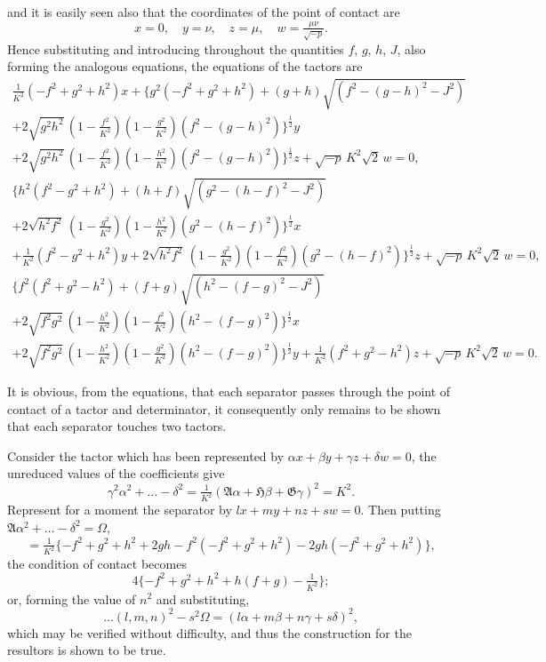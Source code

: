 \documentclass[11pt]{article}
\begin{document}
\newpage
\setcounter{page}{82}

and it is easily seen also that the coordinates of the point of contact are
\[
x = 0, \quad y = \nu, \quad z = \mu, \quad w = \tfrac{\mu\nu}{\sqrt{-p}}.
\]
Hence substituting and introducing throughout the quantities $f$, $g$, $h$, $J$, also forming the analogous equations, the equations of the tactors are
\begin{multline*}
\tfrac{1}{K^2}(-f^2+g^2+h^2)x + \{g^2(-f^2+g^2+h^2)+(g+h)\sqrt{(f^2-(g-h)^2-J^2)}\\
+ 2\sqrt{g^2h^2}\,(1-\tfrac{f^2}{K^2})(1-\tfrac{g^2}{K^2})(f^2-(g-h)^2)\}^{\frac{1}{2}}y\\
+ 2\sqrt{g^2h^2}\,(1-\tfrac{f^2}{K^2})(1-\tfrac{h^2}{K^2})(f^2-(g-h)^2)\}^{\frac{1}{2}}z + \sqrt{-p}\,K^2\sqrt{2}\,w = 0,
\end{multline*}
\begin{multline*}
\{h^2(f^2-g^2+h^2)+(h+f)\sqrt{(g^2-(h-f)^2-J^2)}\\
+ 2\sqrt{h^2f^2}\,(1-\tfrac{g^2}{K^2})(1-\tfrac{h^2}{K^2})(g^2-(h-f)^2)\}^{\frac{1}{2}}x\\
+ \tfrac{1}{K^2}(f^2-g^2+h^2)y + 2\sqrt{h^2f^2}\,(1-\tfrac{g^2}{K^2})(1-\tfrac{f^2}{K^2})(g^2-(h-f)^2)\}^{\frac{1}{2}}z + \sqrt{-p}\,K^2\sqrt{2}\,w = 0,
\end{multline*}
\begin{multline*}
\{f^2(f^2+g^2-h^2)+(f+g)\sqrt{(h^2-(f-g)^2-J^2)}\\
+ 2\sqrt{f^2g^2}\,(1-\tfrac{h^2}{K^2})(1-\tfrac{f^2}{K^2})(h^2-(f-g)^2)\}^{\frac{1}{2}}x\\
+ 2\sqrt{f^2g^2}\,(1-\tfrac{h^2}{K^2})(1-\tfrac{g^2}{K^2})(h^2-(f-g)^2)\}^{\frac{1}{2}}y + \tfrac{1}{K^2}(f^2+g^2-h^2)z + \sqrt{-p}\,K^2\sqrt{2}\,w = 0.
\end{multline*}

\newpage
\setcounter{page}{83}

It is obvious, from the equations, that each separator passes through the point of contact of a tactor and determinator, it consequently only remains to be shown that each separator touches two tactors.

Consider the tactor which has been represented by $\alpha x+\beta y+\gamma z+\delta w=0$, the unreduced values of the coefficients give
\[
\gamma^2\alpha^2+\ldots-\delta^2 = \tfrac{1}{K^2}(\mathfrak{A}\alpha+\mathfrak{H}\beta+\mathfrak{G}\gamma)^2 = K^2.
\]
Represent for a moment the separator by $lx+my+nz+sw=0$. Then putting $\mathfrak{A}\alpha^2+\ldots-\delta^2=\Omega$,
\[
= \tfrac{1}{K^2}\{-f^2+g^2+h^2+2gh-f^2(-f^2+g^2+h^2)-2gh(-f^2+g^2+h^2)\},
\]
the condition of contact becomes
\[
4\{-f^2+g^2+h^2+h(f+g)-\tfrac{1}{K^2}\};
\]
or, forming the value of $n^2$ and substituting,
\[
\ldots(l,m,n)^2 - s^2\Omega = (l\alpha+m\beta+n\gamma+s\delta)^2,
\]
which may be verified without difficulty, and thus the construction for the resultors is shown to be true.
\end{document}
